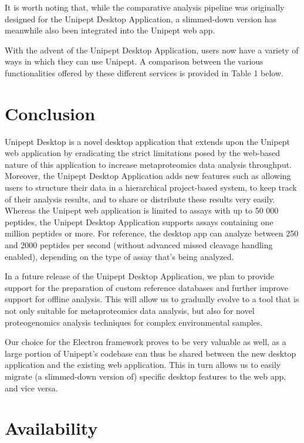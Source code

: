 It is worth noting that, while the comparative analysis pipeline was
originally designed for the Unipept Desktop Application, a slimmed-down
version has meanwhile also been integrated into the Unipept web app.

With the advent of the Unipept Desktop Application, users now have a
variety of ways in which they can use Unipept. A comparison between the
various functionalities offered by these different services is provided
in Table 1 below.

\hypertarget{conclusion}{%
\section{Conclusion}\label{conclusion}}

Unipept Desktop is a novel desktop application that extends upon the
Unipept web application by eradicating the strict limitations posed by
the web-based nature of this application to increase metaproteomics data
analysis throughput. Moreover, the Unipept Desktop Application adds new
features such as allowing users to structure their data in a
hierarchical project-based system, to keep track of their analysis
results, and to share or distribute these results very easily. Whereas
the Unipept web application is limited to assays with up to 50 000
peptides, the Unipept Desktop Application supports assays containing one
million peptides or more. For reference, the desktop app can analyze
between 250 and 2000 peptides per second (without advanced missed
cleavage handling enabled), depending on the type of assay that's being
analyzed.

In a future release of the Unipept Desktop Application, we plan to
provide support for the preparation of custom reference databases and
further improve support for offline analysis. This will allow us to
gradually evolve to a tool that is not only suitable for metaproteomics
data analysis, but also for novel proteogenomics analysis techniques for
complex environmental samples.

Our choice for the Electron framework proves to be very valuable as
well, as a large portion of Unipept's codebase can thus be shared
between the new desktop application and the existing web application.
This in turn allows us to easily migrate (a slimmed-down version of)
specific desktop features to the web app, and vice versa.

\hypertarget{availability}{%
\section{Availability}\label{availability}}

